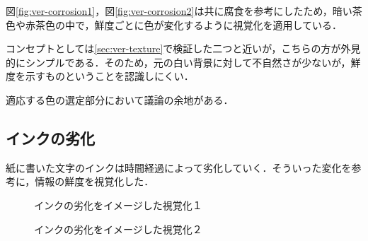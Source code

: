 図\ref{fig:ver-corrosion1}，図\ref{fig:ver-corrosion2}は共に腐食を参考にしたため，暗い茶色や赤茶色の中で，鮮度ごとに色が変化するように視覚化を適用している．

コンセプトとしては\ref{sec:ver-texture}で検証した二つと近いが，こちらの方が外見的にシンプルである．そのため，元の白い背景に対して不自然さが少ないが，鮮度を示すものということを認識しにくい．

適応する色の選定部分において議論の余地がある．

\subsection{インクの劣化}
\label{subsec:ver-col-ink}

紙に書いた文字のインクは時間経過によって劣化していく．そういった変化を参考に，情報の鮮度を視覚化した．

\begin{figure}[htbp]
  \begin{minipage}{0.5\hsize}
    \begin{center}
    \end{center}
    \caption{インクの劣化をイメージした視覚化１}
    \label{fig:ver-ink1}
  \end{minipage}
  \begin{minipage}{0.5\hsize}
    \begin{center}
    \end{center}
    \caption{インクの劣化をイメージした視覚化２}
    \label{fig:ver-ink2}
  \end{minipage}
\end{figure}

